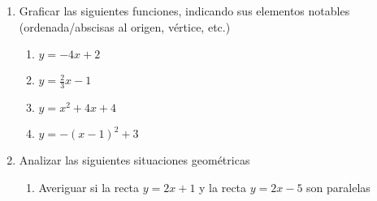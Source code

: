 \documentclass[a4paper]{article}
\newcommand{\answer}{\item[**]}
\newcommand{\exercise}{\item}
\begin{document}
\begin{enumerate}
\begin{multicols}{2}
\begin{enumerate} [label=(\alph*)]
		\item $\displaystyle\frac{1}{x-1}$ con $x \in \mathbb{Z}$ y $x \neq 1$
		\answer Pertenece a $\mathbb{Q}$, por ser el cociente de un número entero y un número entero distinto de cero.

		\item $3 \sqrt{x}$ con $x \in \mathbb{N}$
		\answer Pertenece a $\mathbb{R}$, por ser la raíz cuadrada de un número natural.

		\item $\displaystyle\frac{x^2}{x-4}$ con $x \in \mathbb{Z}$ y $x \neq 4$
		\answer Pertenece a $\mathbb{Q}$, por ser el cociente de un número entero y un número entero distinto de cero.

		\item $\displaystyle\frac{\sqrt{3}x-3}{2}$ con $x \in \mathbb{Z}$
		\answer Pertenece a $\mathbb{R}$, por ser el cociente de un número irracional y un número entero. 

		\item $x+3$ con $x \in \mathbb{Q}$
		\answer Pertenece a $\mathbb{Q}$, por ser la suma de dos números racionales.

		\item $\displaystyle\frac{1}{x}$ con $x \in \mathbb{Q}$ y $x \neq 0$
		\answer Pertenece a $\mathbb{Q}$, por ser el cociente de dos números racionales.

		\item $\sqrt{x}$ con $x \in \mathbb{Q}$
		\answer Pertenece a $\mathbb{R}$, por ser la raíz cuadrada de un número racional.
	\end{enumerate}
	\end{multicols}

	\exercise Graficar las siguientes funciones, indicando sus elementos notables (ordenada/abscisas al origen, vértice, etc.)
	\begin{enumerate} [label=(\alph*)]
		\item $y=-4x+2$

		\item $y=\displaystyle\frac{2}{3}x-1$
		
		\item $y=x^2+4x+4$

		\item $y=-(x-1)^2+3$
	
	\end{enumerate}

	\exercise Analizar las siguientes situaciones geométricas
	\begin{enumerate} [label=(\alph*)]
		\item Averiguar si la recta $y=2x+1$ y la recta $y=2x-5$ son paralelas


\end{enumerate}
\end{enumerate}
\end{document}
